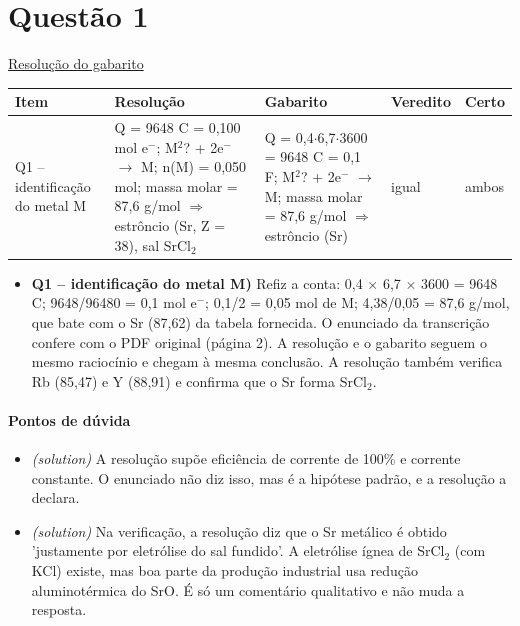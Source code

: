\documentclass{article}%
\begin{document}
\section*{Questão 1}%
\href{https://poliedroresolve.sistemapoliedro.com.br/vestibulares/ime/2026/ime-2-fase-dia-3-25-10-2025-2-fase-dia-3/dissertativa-1-quimica-2-fase-dia-3-ime-2026}{Resolução do gabarito}\par\smallskip%
\begin{longtable}{@{}p{} p{} p{} p{} p{}@{}}\toprule Item & Resolução & Gabarito & Veredito & Certo \\ \midrule
Q1 -- identificação do metal M & Q = 9648 C = 0,100 mol e$^{-}$; M$^2$? + 2e$^{-}$ $\to$ M; n(M) = 0,050 mol; massa molar = 87,6 g/mol $\Rightarrow$ estrôncio (Sr, Z = 38), sal SrCl$_{2}$ & Q = 0,4$\cdot$6,7$\cdot$3600 = 9648 C = 0,1 F; M$^2$? + 2e$^{-}$ $\to$ M; massa molar = 87,6 g/mol $\Rightarrow$ estrôncio (Sr) & igual & ambos \\
\bottomrule\end{longtable}%
\begin{itemize}%
\item%
\textbf{Q1 -- identificação do metal M)} Refiz a conta: 0,4 $\times$ 6,7 $\times$ 3600 = 9648 C; 9648/96480 = 0,1 mol e$^{-}$; 0,1/2 = 0,05 mol de M; 4,38/0,05 = 87,6 g/mol, que bate com o Sr (87,62) da tabela fornecida. O enunciado da transcrição confere com o PDF original (página 2). A resolução e o gabarito seguem o mesmo raciocínio e chegam à mesma conclusão. A resolução também verifica Rb (85,47) e Y (88,91) e confirma que o Sr forma SrCl$_{2}$.%
\end{itemize}%
\paragraph{Pontos de dúvida}%
\begin{itemize}%
\item%
\textit{(solution)} A resolução supõe eficiência de corrente de 100\% e corrente constante. O enunciado não diz isso, mas é a hipótese padrão, e a resolução a declara.%
\item%
\textit{(solution)} Na verificação, a resolução diz que o Sr metálico é obtido 'justamente por eletrólise do sal fundido'. A eletrólise ígnea de SrCl$_{2}$ (com KCl) existe, mas boa parte da produção industrial usa redução aluminotérmica do SrO. É só um comentário qualitativo e não muda a resposta.%
\end{itemize}%
\end{document}
